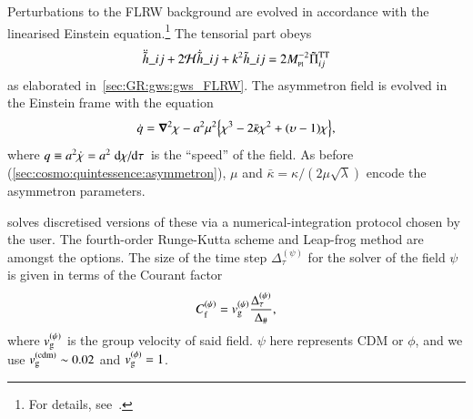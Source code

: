     Perturbations to the FLRW background are evolved in accordance with the linearised Einstein equation.\footnote{For details, see~\citet{adamekGevolutionCosmologicalNbody2016}.} %
    The tensorial part obeys 
    \begin{equation}
        \ddot{\Ft{h}}\_{ij} + 2\mathcal{H} \dot{\Ft{h}}\_{ij} + k^2 \Ft{h}\_{ij} =  2M\nped{Pl}^{-2} \Ft{\Pi}\indices*{^{\mathrm{TT}}_{ij}}
    \end{equation}
    as elaborated in~\cref{sec:GR:gws:gws_FLRW}. %
    The asymmetron field is evolved in the Einstein frame with the equation
    \begin{equation}
        \dot{q} = \boldsymbol{\nabla}^2 \chi - a^2 \mu^2 {\left\{ \chi^3 - 2\bar{\kappa} \chi^2 + (\upsilon-1) \chi \right\}},
    \end{equation}
    where $q\equiv a^2 \dot{\chi}=a^2 \dv*{\chi}{\tau}$ is the ``speed'' of the field. As before (\cref{sec:cosmo:quintessence:asymmetron}), $\mu$ and $\bar{\kappa}=\kappa /(2\mu\sqrt{\lambda})$ encode the asymmetron parameters. 



    \asgrd{} solves discretised versions of these via a numerical-integration protocol chosen by the user. The fourth-order Runge-Kutta scheme and Leap-frog method are amongst the options. %
    The size of the time step $\Delta_\tau^{(\psi)}$ for the solver of the field $\psi$ is given in terms of the Courant factor~\citep{christiansenAsimulationDomainFormation2024}
    \begin{equation}
        C_\mathrm{f}^{(\psi)} = v_\mathrm{g}^{(\psi)} \frac{\Delta_\tau^{(\psi)}}{\Delta_\#},
    \end{equation}
    where $ v_\mathrm{g}^{(\psi)}$ is the group velocity of said field. $\psi$ here represents CDM or $\phi$, and we use $v_\mathrm{g}^\mathrm{(cdm)}\sim 0.02$ and $v_\mathrm{g}^{(\phi)}= 1$. 













